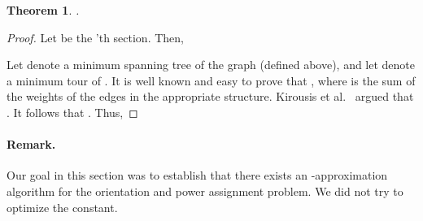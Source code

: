 \documentclass[11pt,letter]{article}
\newtheorem{theorem}{Theorem}[section]
\begin{document}
\begin{theorem}
.
\end{theorem}

\begin{proof}
Let  be the 'th section. Then,

Let  denote a minimum spanning tree of the graph  (defined above), and
let  denote a minimum tour of . It is well known and easy to prove that
, where  is the sum of the weights of the edges in the appropriate structure.
Kirousis et al.~\cite{KKKP00} argued that . It follows that .
Thus,


\end{proof}

\paragraph{Remark.}
Our goal in this section was to establish that there exists an -approximation algorithm for the orientation and power assignment problem. We did not try to optimize the constant.
\end{document}

